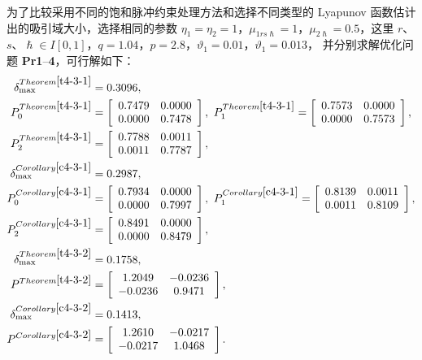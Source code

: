 为了比较采用不同的饱和脉冲约束处理方法和选择不同类型的 Lyapunov 函数估计出的吸引域大小，选择相同的参数   $\eta_1=
\eta_2=1$，$\mu_{1rs\hslash}= 1$，$\mu_{2\hslash}= 0.5$，这里 $r$、$s$、$\hslash\in I[0,1]$，$q=1.04$，$
p=2.8$，$\vartheta_1=0.01$，$
\vartheta_1=0.013$， 并分别求解优化问题 \textbf{Pr1}--\textbf{4}，可行解如下： 
\begin{align*} 
\delta^{Theorem \ref{t4-3-1}}_{\max}&=0.3096,\\ 
P^{Theorem \ref{t4-3-1}}_0&=\left[ \begin{array}{cc}
0.7479&  0.0000\\
0.0000&0.7478
\end{array}
\right],~
P^{Theorem \ref{t4-3-1}}_1=\left[ \begin{array}{cc}
0.7573& 0.0000\\
0.0000& 0.7573
\end{array}\right],\\  
P^{Theorem \ref{t4-3-1}}_2&=\left[ \begin{array}{cc}
0.7788 &0.0011\\
0.0011& 0.7787
\end{array}\right],\\
\delta^{Corollary \ref{c4-3-1}}_{\max}&=0.2987,\\ 
P^{Corollary \ref{c4-3-1}}_0&=\left[ \begin{array}{cc}
0.7934& 0.0000\\
0.0000& 0.7997
\end{array}
\right],~
P^{Corollary \ref{c4-3-1}}_1=\left[ \begin{array}{cc}
0.8139&0.0011\\
0.0011 &0.8109
\end{array}\right],\\ 
P^{Corollary \ref{c4-3-1}}_2&=\left[ \begin{array}{cc}
0.8491& 0.0000\\
0.0000& 0.8479
\end{array}\right],\\
\delta^{Theorem \ref{t4-3-2}}_{\max}&=0.1758,\\  
P^{Theorem \ref{t4-3-2}}&=\left[ \begin{array}{cc}
1.2049&-0.0236\\
-0.0236&0.9471
\end{array}\right],\\ \delta^{Corollary \ref{c4-3-2}}_{\max}&=0.1413,\\  
P^{Corollary \ref{c4-3-2}}&=\left[ \begin{array}{cc}
1.2610&-0.0217\\
-0.0217&1.0468
\end{array}\right]. 
\end{align*}
